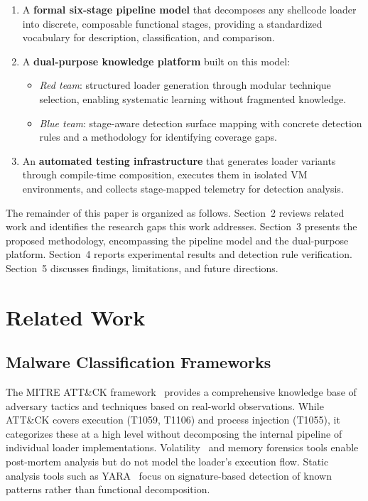 \documentclass[10pt,a4paper,twocolumn]{article}
\begin{document}
\begin{enumerate}[leftmargin=*, itemsep=2pt]
    \item A \textbf{formal six-stage pipeline model} that decomposes any shellcode loader into discrete, composable functional stages, providing a standardized vocabulary for description, classification, and comparison.

    \item A \textbf{dual-purpose knowledge platform} built on this model:
    \begin{itemize}[leftmargin=*, itemsep=1pt]
        \item \textit{Red team}: structured loader generation through modular technique selection, enabling systematic learning without fragmented knowledge.
        \item \textit{Blue team}: stage-aware detection surface mapping with concrete detection rules and a methodology for identifying coverage gaps.
    \end{itemize}

    \item An \textbf{automated testing infrastructure} that generates loader variants through compile-time composition, executes them in isolated VM environments, and collects stage-mapped telemetry for detection analysis.
\end{enumerate}

The remainder of this paper is organized as follows.
Section~2 reviews related work and identifies the research gaps this work addresses.
Section~3 presents the proposed methodology, encompassing the pipeline model and the dual-purpose platform.
Section~4 reports experimental results and detection rule verification.
Section~5 discusses findings, limitations, and future directions.

\section{Related Work}

\subsection{Malware Classification Frameworks}

The MITRE ATT\&CK framework~\cite{mitre_attack} provides a comprehensive knowledge base of adversary tactics and techniques based on real-world observations.
While ATT\&CK covers execution (T1059, T1106) and process injection (T1055), it categorizes these at a high level without decomposing the internal pipeline of individual loader implementations.
Volatility~\cite{volatility} and memory forensics tools enable post-mortem analysis but do not model the loader's execution flow.
Static analysis tools such as YARA~\cite{yara} focus on signature-based detection of known patterns rather than functional decomposition.
\end{document}
